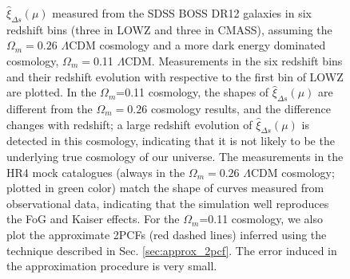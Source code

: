 \documentclass[iop]{emulateapj}
\begin{document}
\begin{figure}
   \caption{\label{fig_xi}
   $\hat\xi_{\Delta s}(\mu)$ measured from the SDSS BOSS DR12 galaxies in six redshift bins (three in LOWZ and three in CMASS),
   assuming the $\Omega_m=0.26$ $\Lambda$CDM cosmology and a more dark energy dominated cosmology, $\Omega_m=$0.11 $\Lambda$CDM.
   Measurements in the six redshift bins and their redshift evolution with respective to the first bin of LOWZ are plotted.
   In the $\Omega_m$=0.11 cosmology, the shapes of $\hat\xi_{\Delta s}(\mu)$ are different from the $\Omega_m=0.26$ cosmology results,
   and the difference changes with redshift;
   a large redshift evolution of $\hat\xi_{\Delta s}(\mu)$ is detected in this cosmology, 
   indicating that it is not likely to be the underlying true cosmology of our universe.
   The measurements in the HR4 mock catalogues (always in the $\Omega_m=0.26$ $\Lambda$CDM cosmology; plotted in green color)
   match the shape of curves measured from observational data, 
   indicating that the simulation well reproduces the FoG and Kaiser effects.
   For the $\Omega_m$=0.11 cosmology, we also plot the approximate 2PCFs (red dashed lines) 
   inferred using the technique described in Sec. \ref{sec:approx_2pcf}.
   The error induced in the approximation procedure is very small.
   }
\end{figure}
\end{document}
